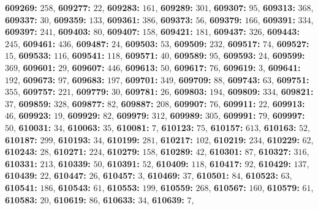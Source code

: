 \textsf{\bfseries 609269:} $258$, \textsf{\bfseries 609277:} $22$, \textsf{\bfseries 609283:} $161$, \textsf{\bfseries 609289:} $301$, \textsf{\bfseries 609307:} $95$, \textsf{\bfseries 609313:} $368$, \textsf{\bfseries 609337:} $30$, \textsf{\bfseries 609359:} $133$, \textsf{\bfseries 609361:} $386$, \textsf{\bfseries 609373:} $56$, \textsf{\bfseries 609379:} $166$, \textsf{\bfseries 609391:} $334$, \textsf{\bfseries 609397:} $241$, \textsf{\bfseries 609403:} $80$, \textsf{\bfseries 609407:} $158$, \textsf{\bfseries 609421:} $181$, \textsf{\bfseries 609437:} $326$, \textsf{\bfseries 609443:} $245$, \textsf{\bfseries 609461:} $436$, \textsf{\bfseries 609487:} $24$, \textsf{\bfseries 609503:} $53$, \textsf{\bfseries 609509:} $232$, \textsf{\bfseries 609517:} $74$, \textsf{\bfseries 609527:} $15$, \textsf{\bfseries 609533:} $116$, \textsf{\bfseries 609541:} $118$, \textsf{\bfseries 609571:} $40$, \textsf{\bfseries 609589:} $95$, \textsf{\bfseries 609593:} $24$, \textsf{\bfseries 609599:} $369$, \textsf{\bfseries 609601:} $29$, \textsf{\bfseries 609607:} $446$, \textsf{\bfseries 609613:} $50$, \textsf{\bfseries 609617:} $76$, \textsf{\bfseries 609619:} $3$, \textsf{\bfseries 609641:} $192$, \textsf{\bfseries 609673:} $97$, \textsf{\bfseries 609683:} $197$, \textsf{\bfseries 609701:} $349$, \textsf{\bfseries 609709:} $88$, \textsf{\bfseries 609743:} $63$, \textsf{\bfseries 609751:} $355$, \textsf{\bfseries 609757:} $221$, \textsf{\bfseries 609779:} $30$, \textsf{\bfseries 609781:} $26$, \textsf{\bfseries 609803:} $194$, \textsf{\bfseries 609809:} $334$, \textsf{\bfseries 609821:} $37$, \textsf{\bfseries 609859:} $328$, \textsf{\bfseries 609877:} $82$, \textsf{\bfseries 609887:} $208$, \textsf{\bfseries 609907:} $76$, \textsf{\bfseries 609911:} $22$, \textsf{\bfseries 609913:} $46$, \textsf{\bfseries 609923:} $19$, \textsf{\bfseries 609929:} $82$, \textsf{\bfseries 609979:} $312$, \textsf{\bfseries 609989:} $305$, \textsf{\bfseries 609991:} $79$, \textsf{\bfseries 609997:} $50$, \textsf{\bfseries 610031:} $34$, \textsf{\bfseries 610063:} $35$, \textsf{\bfseries 610081:} $7$, \textsf{\bfseries 610123:} $75$, \textsf{\bfseries 610157:} $613$, \textsf{\bfseries 610163:} $52$, \textsf{\bfseries 610187:} $299$, \textsf{\bfseries 610193:} $34$, \textsf{\bfseries 610199:} $281$, \textsf{\bfseries 610217:} $102$, \textsf{\bfseries 610219:} $234$, \textsf{\bfseries 610229:} $62$, \textsf{\bfseries 610243:} $28$, \textsf{\bfseries 610271:} $224$, \textsf{\bfseries 610279:} $158$, \textsf{\bfseries 610289:} $42$, \textsf{\bfseries 610301:} $87$, \textsf{\bfseries 610327:} $316$, \textsf{\bfseries 610331:} $213$, \textsf{\bfseries 610339:} $50$, \textsf{\bfseries 610391:} $52$, \textsf{\bfseries 610409:} $118$, \textsf{\bfseries 610417:} $92$, \textsf{\bfseries 610429:} $137$, \textsf{\bfseries 610439:} $22$, \textsf{\bfseries 610447:} $26$, \textsf{\bfseries 610457:} $3$, \textsf{\bfseries 610469:} $37$, \textsf{\bfseries 610501:} $84$, \textsf{\bfseries 610523:} $63$, \textsf{\bfseries 610541:} $186$, \textsf{\bfseries 610543:} $61$, \textsf{\bfseries 610553:} $199$, \textsf{\bfseries 610559:} $268$, \textsf{\bfseries 610567:} $160$, \textsf{\bfseries 610579:} $61$, \textsf{\bfseries 610583:} $20$, \textsf{\bfseries 610619:} $86$, \textsf{\bfseries 610633:} $34$, \textsf{\bfseries 610639:} $7$, 
